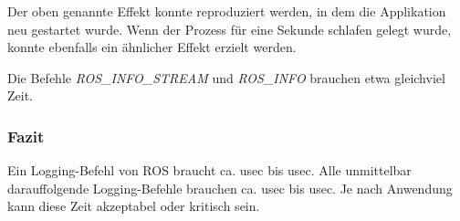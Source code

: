 Der oben genannte Effekt konnte reproduziert werden, in dem die Applikation neu gestartet wurde.
Wenn der Prozess für eine Sekunde schlafen gelegt wurde, konnte ebenfalls ein ähnlicher Effekt erzielt werden.

Die Befehle \textit{ROS\_INFO\_STREAM} und \textit{ROS\_INFO} brauchen etwa gleichviel Zeit.

\subsubsection{Fazit}
Ein Logging-Befehl von ROS braucht ca. \unit[50]{usec} bis \unit[80]{usec}.
Alle unmittelbar darauffolgende Logging-Befehle brauchen ca. \unit[10]{usec} bis \unit[15]{usec}.
Je nach Anwendung kann diese Zeit akzeptabel oder kritisch sein.




